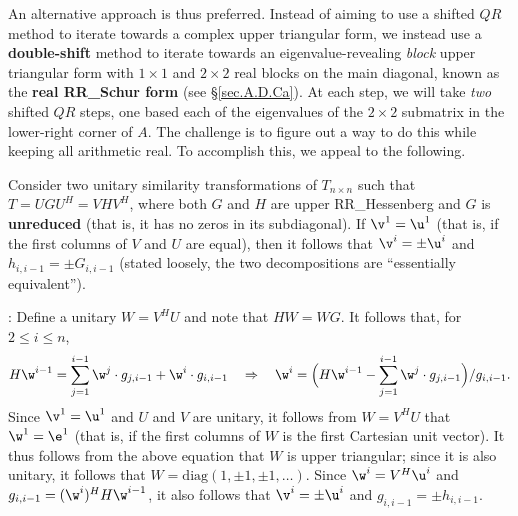 \begin{figure*}[t]
\end{figure*}

\noindent An alternative approach is thus preferred.  Instead of aiming to use a shifted $QR$ method to iterate towards a complex upper triangular form,
we instead use a {\bf double-shift} method to iterate towards an eigenvalue-revealing {\it block} upper triangular form with $1\times 1$ and $2\times 2$ real blocks on the
main diagonal, known as the {\bf real RR_Schur form} (see \S \ref{sec.A.D.Ca}).  At each step, we will take {\it two} shifted $QR$ steps, one based each of the eigenvalues of the $2\times 2$ submatrix in the
lower-right corner of $A$.  The challenge is to figure out a way to do this while keeping all arithmetic real.  To accomplish this, we appeal to the following.

\begin{fact} \label{fact.implicitQ}
Consider two unitary similarity transformations of $T_{n\times n}$ such that\break $T = U G U^H = V H V^H$, where both $G$ and $H$ are upper RR_Hessenberg and $G$ is {\bf unreduced} (that is, it has no zeros
in its subdiagonal).  If $\v^1=\u^1$ (that is, if the first columns of $V$ and $U$ are equal), then it follows that $\v^i=\pm\u^i$ and $h_{i,i-1}=\pm G_{i,i-1}$ (stated loosely, the two decompositions
are ``essentially equivalent'').
\end{fact}

\/: Define a unitary $W=V^H U$ and note that $HW = WG$.   It follows that, for $2\le i\le n$,
\begin{equation*}
H\w^{i-1} = \sum_{j=1}^{i-1} \w^j \cdot g_{j,i-1}  + \w^i \cdot g_{i,i-1} \quad \Rightarrow \quad \w^i = \Big( H\w^{i-1} - \sum_{j=1}^{i-1} \w^j \cdot g_{j,i-1} \Big)/ g_{i,i-1}.
\end{equation*}
Since $\v^1=\u^1$ and $U$ and $V$ are unitary, it follows from $W=V^H U$ that $\w^1=\e^1$ (that is, if the first columns of $W$ is the first Cartesian unit vector).
It thus follows from the above equation that $W$ is upper triangular; since it is also unitary, it follows that $W=\textrm{diag}(1,\pm 1,\pm 1,\ldots)$.
Since $\w^i=V^H \u^i$ and $g_{i,i-1}=(\w^i)^H H \w^{i-1}$, it also follows that $\v^i=\pm \u^i$ and $g_{i,i-1}=\pm h_{i,i-1}$.  \endproof

